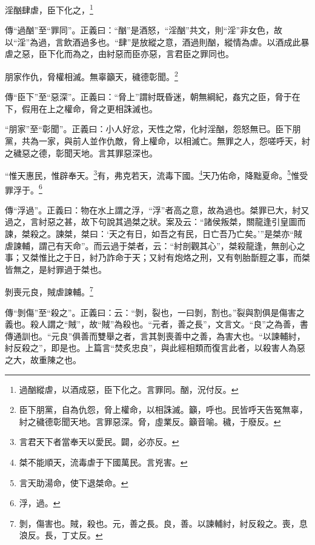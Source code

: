 淫酗肆虐，臣下化之，\footnote{過酗縱虐，以酒成惡，臣下化之。言罪同。酗，況付反。}

{\noindent\zhuan{}\fzbyks 傳“過酗”至“罪同”。正義曰：“酗”是酒怒，“淫酗”共文，則“淫”非女色，故以“淫”為過，言飲酒過多也。“肆”是放縱之意，酒過則酗，縱情為虐。以酒成此暴虐之惡，臣下化而為之，由紂惡而臣亦惡，言君臣之罪同也。 \par}

朋家作仇，脅權相滅。無辜籲天，穢德彰聞。\footnote{臣下朋黨，自為仇怨，脅上權命，以相誅滅。籲，呼也。民皆呼天告冤無辜，紂之穢德彰聞天地。言罪惡深。脅，虛業反。籲音喻。穢，于廢反。}

{\noindent\zhuan{}\fzbyks 傳“臣下”至“惡深”。正義曰：“脅上”謂紂既昏迷，朝無綱紀，姦宄之臣，脅于在下，假用在上之權命，脅之更相誅滅也。 \par}

{\noindent\shu{}\fzkt “朋家”至“彰聞”。正義曰：小人好忿，天性之常，化紂淫酗，怨怒無已。臣下朋黨，共為一家，與前人並作仇敵，脅上權命，以相滅亡。無罪之人，怨嗟呼天，紂之穢惡之德，彰聞天地。言其罪惡深也。 \par}

“惟天惠民，惟辟奉天。\footnote{言君天下者當奉天以愛民。闢，必亦反。}有，弗克若天，流毒下國。\footnote{桀不能順天，流毒虐于下國萬民。言兇害。}天乃佑命，降黜夏命。\footnote{言天助湯命，使下退桀命。}惟受罪浮于。\footnote{浮，過。}

{\noindent\zhuan{}\fzbyks 傳“浮過”。正義曰：物在水上謂之浮，“浮”者高之意，故為過也。桀罪已大，紂又過之，言紂惡之甚，故下句說其過桀之狀。案及云：“諸侯叛桀，關龍逢引皇圖而諫，桀殺之。諫桀，桀曰：‘天之有日，如吾之有民，日亡吾乃亡矣。’”是桀亦“賊虐諫輔，謂己有天命”。而云過于桀者，云：“紂剖觀其心”，桀殺龍逢，無剖心之事；又桀惟比之于日，紂乃詐命于天；又紂有炮烙之刑，又有刳胎斮脛之事，而桀皆無之，是紂罪過于桀也。 \par}

剝喪元良，賊虐諫輔。\footnote{剝，傷害也。賊，殺也。元，善之長。良，善。以諫輔紂，紂反殺之。喪，息浪反。長，丁丈反。}

{\noindent\zhuan{}\fzbyks 傳“剝傷”至“殺之”。正義曰：云：“剝，裂也，一曰剝，割也。”裂與割俱是傷害之義也。殺人謂之“賊”，故“賊”為殺也。“元者，善之長”，文言文。“良”之為善，書傳通訓也。“元良”俱善而雙舉之者，言其剝喪善中之善，為害大也。“以諫輔紂，紂反殺之”，即是也。上篇言“焚炙忠良”，與此經相類而復言此者，以殺害人為惡之大，故重陳之也。 \par}

